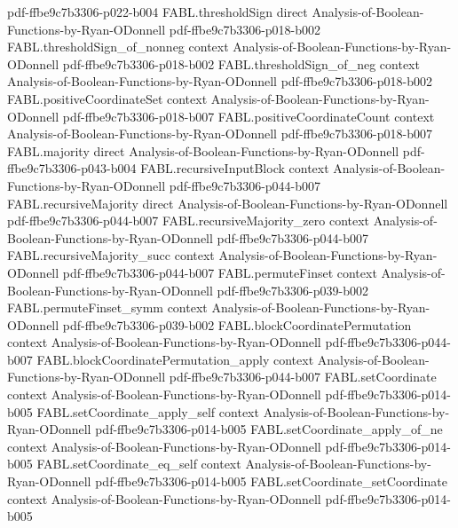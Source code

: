 \begin{theorem}
  {pdf-ffbe9c7b3306-p022-b004}
\proofstep
  {FABL.thresholdSign}
  {direct}
  {Analysis-of-Boolean-Functions-by-Ryan-ODonnell}
  {pdf-ffbe9c7b3306-p018-b002}
\proofstep
  {FABL.thresholdSign_of_nonneg}
  {context}
  {Analysis-of-Boolean-Functions-by-Ryan-ODonnell}
  {pdf-ffbe9c7b3306-p018-b002}
\proofstep
  {FABL.thresholdSign_of_neg}
  {context}
  {Analysis-of-Boolean-Functions-by-Ryan-ODonnell}
  {pdf-ffbe9c7b3306-p018-b002}
\proofstep
  {FABL.positiveCoordinateSet}
  {context}
  {Analysis-of-Boolean-Functions-by-Ryan-ODonnell}
  {pdf-ffbe9c7b3306-p018-b007}
\proofstep
  {FABL.positiveCoordinateCount}
  {context}
  {Analysis-of-Boolean-Functions-by-Ryan-ODonnell}
  {pdf-ffbe9c7b3306-p018-b007}
\proofstep
  {FABL.majority}
  {direct}
  {Analysis-of-Boolean-Functions-by-Ryan-ODonnell}
  {pdf-ffbe9c7b3306-p043-b004}
\proofstep
  {FABL.recursiveInputBlock}
  {context}
  {Analysis-of-Boolean-Functions-by-Ryan-ODonnell}
  {pdf-ffbe9c7b3306-p044-b007}
\proofstep
  {FABL.recursiveMajority}
  {direct}
  {Analysis-of-Boolean-Functions-by-Ryan-ODonnell}
  {pdf-ffbe9c7b3306-p044-b007}
\proofstep
  {FABL.recursiveMajority_zero}
  {context}
  {Analysis-of-Boolean-Functions-by-Ryan-ODonnell}
  {pdf-ffbe9c7b3306-p044-b007}
\proofstep
  {FABL.recursiveMajority_succ}
  {context}
  {Analysis-of-Boolean-Functions-by-Ryan-ODonnell}
  {pdf-ffbe9c7b3306-p044-b007}
\proofstep
  {FABL.permuteFinset}
  {context}
  {Analysis-of-Boolean-Functions-by-Ryan-ODonnell}
  {pdf-ffbe9c7b3306-p039-b002}
\proofstep
  {FABL.permuteFinset_symm}
  {context}
  {Analysis-of-Boolean-Functions-by-Ryan-ODonnell}
  {pdf-ffbe9c7b3306-p039-b002}
\proofstep
  {FABL.blockCoordinatePermutation}
  {context}
  {Analysis-of-Boolean-Functions-by-Ryan-ODonnell}
  {pdf-ffbe9c7b3306-p044-b007}
\proofstep
  {FABL.blockCoordinatePermutation_apply}
  {context}
  {Analysis-of-Boolean-Functions-by-Ryan-ODonnell}
  {pdf-ffbe9c7b3306-p044-b007}
\proofstep
  {FABL.setCoordinate}
  {context}
  {Analysis-of-Boolean-Functions-by-Ryan-ODonnell}
  {pdf-ffbe9c7b3306-p014-b005}
\proofstep
  {FABL.setCoordinate_apply_self}
  {context}
  {Analysis-of-Boolean-Functions-by-Ryan-ODonnell}
  {pdf-ffbe9c7b3306-p014-b005}
\proofstep
  {FABL.setCoordinate_apply_of_ne}
  {context}
  {Analysis-of-Boolean-Functions-by-Ryan-ODonnell}
  {pdf-ffbe9c7b3306-p014-b005}
\proofstep
  {FABL.setCoordinate_eq_self}
  {context}
  {Analysis-of-Boolean-Functions-by-Ryan-ODonnell}
  {pdf-ffbe9c7b3306-p014-b005}
\proofstep
  {FABL.setCoordinate_setCoordinate}
  {context}
  {Analysis-of-Boolean-Functions-by-Ryan-ODonnell}
  {pdf-ffbe9c7b3306-p014-b005}

\end{theorem}
